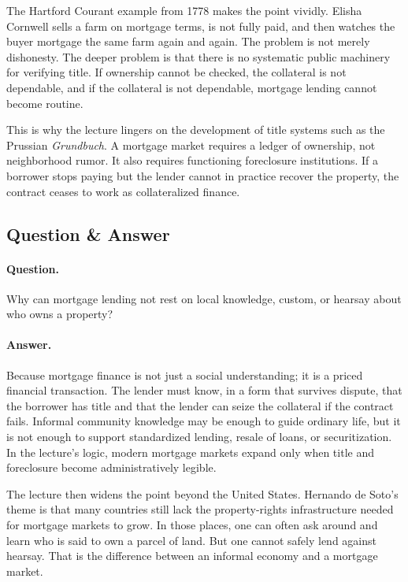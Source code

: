 The Hartford Courant example from 1778 makes the point vividly. Elisha Cornwell sells a farm on mortgage terms, is not fully paid, and then watches the buyer mortgage the same farm again and again. The problem is not merely dishonesty. The deeper problem is that there is no systematic public machinery for verifying title. If ownership cannot be checked, the collateral is not dependable, and if the collateral is not dependable, mortgage lending cannot become routine.

This is why the lecture lingers on the development of title systems such as the Prussian \emph{Grundbuch}. A mortgage market requires a ledger of ownership, not neighborhood rumor. It also requires functioning foreclosure institutions. If a borrower stops paying but the lender cannot in practice recover the property, the contract ceases to work as collateralized finance.

\subsection{Question \& Answer}

\paragraph{Question.} Why can mortgage lending not rest on local knowledge, custom, or hearsay about who owns a property?

\paragraph{Answer.} Because mortgage finance is not just a social understanding; it is a priced financial transaction. The lender must know, in a form that survives dispute, that the borrower has title and that the lender can seize the collateral if the contract fails. Informal community knowledge may be enough to guide ordinary life, but it is not enough to support standardized lending, resale of loans, or securitization. In the lecture's logic, modern mortgage markets expand only when title and foreclosure become administratively legible.

The lecture then widens the point beyond the United States. Hernando de Soto's theme is that many countries still lack the property-rights infrastructure needed for mortgage markets to grow. In those places, one can often ask around and learn who is said to own a parcel of land. But one cannot safely lend against hearsay. That is the difference between an informal economy and a mortgage market.

